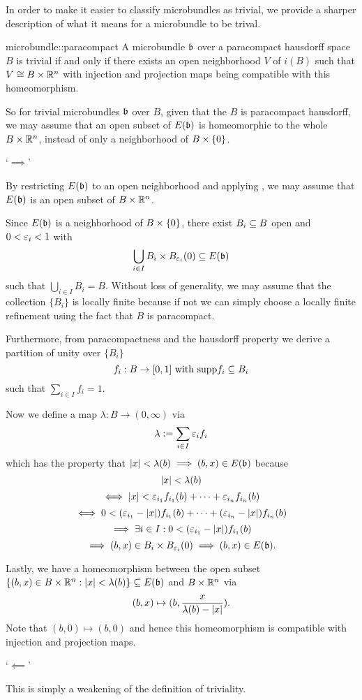 \begin{myparagraph}
    In order to make it easier to classify microbundles as trivial,
    we provide a sharper description of what it means for a microbundle to be trival. 
\end{myparagraph}

\begin{mylemma}{microbundle::paracompact}{}
    A microbundle $\mathfrak{b}$ over a paracompact hausdorff space $B$ is trivial
    if and only if there exists an open neighborhood $V$ of $i(B)$ such that $V \cong B \times \mathbb{R}^n$
    with injection and projection maps being compatible with this homeomorphism.
\end{mylemma}

\begin{myparagraph}
    So for trivial microbundles $\mathfrak{b}$ over $B$, given that the $B$ is paracompact hausdorff,
    we may assume that an open subset of $E(\mathfrak{b})$ is homeomorphic to the whole $B \times \mathbb{R}^n$,
    instead of only a neighborhood of $B \times{} \{0\}$.
\end{myparagraph}

\begin{myproof}
    `$\implies$'

    By restricting $E(\mathfrak{b})$ to an open neighborhood and applying ,
    we may assume that $E(\mathfrak{b})$ is an open subset of $B \times \mathbb{R}^n$.

    Since $E(\mathfrak{b})$ is a neighborhood of $B \times{} \{0\}$, there exist $B_i \subseteq{} B$ open and $0 < \varepsilon{}_i < 1$ with
    \[ \bigcup_{i \in I } B_i \times \ball[\eps_i] \sub E(\bb)\]
    such that $\bigcup_{i \in I} B_i = B$.
    Without loss of generality, we may assume that the collection $\{B_i\}$ is locally finite because if not
    we can simply choose a locally finite refinement using the fact that $B$ is paracompact.

    Furthermore, from paracompactness and the hausdorff property we derive a partition of unity over $\{B_i\}$
    \[ f_i: B \to [0, 1] \text{ with } \text{supp}{f_i} \subseteq{} B_i\]
    such that $\sum_{i \in I}f_i = 1$.
    
    Now we define a map $\lambda: B \to (0, \infty)$ via
    \[ \lambda := \sum_{i \in I} \varepsilon{}_i f_i \]
    which has the property that $\vert{} x \vert{} < \lambda(b) \implies (b, x) \in E(\mathfrak{b})$ because
    \[ \vert{} x \vert{} < \lambda(b) \]
    \[ \iff  \vert{} x \vert{} < \varepsilon{}_{i_1} f_{i_1}(b) + \cdots + \varepsilon{}_{i_n} f_{i_n}(b) \]
    \[ \iff 0 < (\varepsilon{}_{i_1} - \vert{} x \vert{}) f_{i_1}(b) + \cdots + (\varepsilon{}_{i_n} - \vert{} x \vert{}) f_{i_n}(b) \]
    \[ \implies \exists i \in I: 0 < (\varepsilon{}_{i_1} - \vert{} x \vert{}) f_{i_1}(b) \]
    \[ \implies (b, x) \in B_i \times \ball[\eps_i]  \implies (b, x) \in E(\bb). \]

    Lastly, we have a homeomorphism between the open subset
    $\{(b, x) \in B \times \mathbb{R}^n:\vert{} x \vert{} < \lambda(b)\} \subseteq{} E(\mathfrak{b})$ and $B \times \mathbb{R}^n$ via
    \[ (b, x) \mapsto (b, \frac{x}{\lambda(b) - \vert{} x \vert{}}). \]
    Note that $(b, 0) \mapsto (b, 0)$ and hence this homeomorphism is compatible with injection and projection maps.

    `$\impliedby$'

    This is simply a weakening of the definition of triviality. 
\end{myproof}